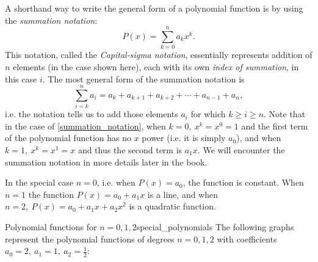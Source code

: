 A shorthand way to write the general form of a polynomial function is by using the \emph{summation notation}:
\begin{equation}
	P(x) = \sum\limits_{k=0}^{n}a_{k}x^{k}.
	\label{eq:summation_notation}
\end{equation}
This notation, called the \emph{Capital-sigma notation}, essentially represents addition of $n$ elements (in the case shown here), each with its own \emph{index of summation}, in this case $i$. The most general form of the summation notation is
\begin{equation}
	\sum\limits_{i=k}^{n}a_{i} = a_{k} + a_{k+1} + a_{k+2} + \cdots + a_{n-1} + a_{n},
	\label{eq:summation_notation_general}
\end{equation}
i.e. the notation tells us to add those elements $a_{i}$ for which $k\geq i\geq n$. Note that in the case of \eqref{summation_notation}, when $k=0,\ x^{k}=x^{0}=1$ and the first term of the polynomial function has no $x$ power (i.e. it is simply $a_{0}$), and when $k=1,\ x^{k}=x^{1}=x$ and thus the second term is $a_{1}x$. We will encounter the summation notation in more details later in the book.

In the special case $n=0$, i.e. when $P(x)=a_{0}$, the function is constant. When $n=1$ the function $P(x)=a_{0}+a_{1}x$ is a line, and when $n=2,\ P(x)=a_{0}+a_{1}x+a_{2}x^{2}$ is a quadratic function.

\begin{example}{Polynomial functions for $n=0,1,2$}{special_polynomials}
	The following graphs represent the polynomial functions of degrees $n=0,1,2$ with coefficients $a_{0}=2,\ a_{1}=1,\ a_{2}=\frac{1}{2}$:

	\begin{figure}[H]
		\centering
	\end{figure}
\end{example}

